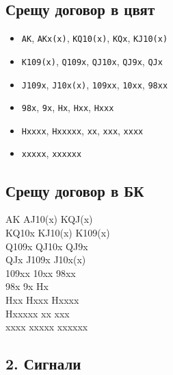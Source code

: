 \documentclass[10pt,a5paper]{extarticle}
\begin{document}
\subsection*{Срещу договор в цвят}
\begin{multicols}{3}
\begin{itemize}
  \item[] \texttt{AK}, \texttt{AKx(x)}, \texttt{KQ10(x)}, \texttt{KQx}, \texttt{KJ10(x)}  
  \item[] \texttt{K109(x)}, \texttt{Q109x}, \texttt{QJ10x}, \texttt{QJ9x}, \texttt{QJx}  
  \item[] \texttt{J109x}, \texttt{J10x(x)}, \texttt{109xx}, \texttt{10xx}, \texttt{98xx}  
  \item[] \texttt{98x}, \texttt{9x}, \texttt{Hx}, \texttt{Hxx}, \texttt{Hxxx}  
  \item[] \texttt{Hxxxx}, \texttt{Hxxxxx}, \texttt{xx}, \texttt{xxx}, \texttt{xxxx}  
  \item[] \texttt{xxxxx}, \texttt{xxxxxx}  
\end{itemize}
\end{multicols}
\newpage
\subsection*{Срещу договор в БК}

\begin{multicols}{3}
AK \quad AJ10(x) \quad KQJ(x) \\
KQ10x \quad KJ10(x) \quad K109(x) \\
Q109x \quad QJ10x \quad QJ9x \\
QJx \quad J109x \quad J10x(x) \\
109xx \quad 10xx \quad 98xx \\
98x \quad 9x \quad Hx \\
Hxx \quad Hxxx \quad Hxxxx \\
Hxxxxx \quad xx \quad xxx \\
xxxx \quad xxxxx \quad xxxxxx
\end{multicols}

\subsection*{2. Сигнали}
\end{document}
